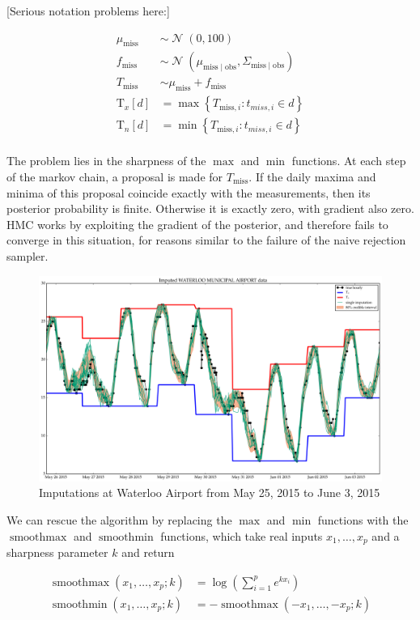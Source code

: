 \documentclass[letter]{article}
\makeatletter
\def\maxwidth{\ifdim\Gin@nat@width>\linewidth\linewidth
\else\Gin@nat@width\fi}
\let\Oldincludegraphics\includegraphics
\renewcommand{\includegraphics}[1]{\Oldincludegraphics[width=.8\maxwidth]{#1}}
\newcommand{\genericdel}[3]{%
      \left#1#3\right#2
    }
\newcommand{\del}[1]{\genericdel(){#1}}
\newcommand{\sbr}[1]{\genericdel[]{#1}}
\newcommand{\cbr}[1]{\genericdel\{\}{#1}}
\DeclareMathOperator{\normal}{\mathcal{N}}
\newcommand{\Tn}{\mathrm{T}_{n}}
\newcommand{\Tx}{\mathrm{T}_{x}}
\newcommand{\miss}{\mathrm{miss}}
\newcommand{\obs}{\mathrm{obs}}
\DeclareMathOperator{\softmax}{smoothmax}
\DeclareMathOperator{\softmin}{smoothmin}
\makeatother
\begin{document}
{[}Serious notation problems here:{]}

\begin{align}
    \mu_\miss &\sim \normal\del{0,100} \\
    f_\miss &\sim \normal\del{\mu_{\miss \mid \obs}, \Sigma_{\miss \mid \obs}} \\
    T_\miss &\sim \mu_\miss + f_\miss \\
    \Tx\sbr{d} &= \max\cbr{ T_{\miss,i}: t_{miss,i} \in d } \\
    \Tn\sbr{d} &= \min\cbr{ T_{\miss,i}: t_{miss,i} \in d } \\
\end{align}

The problem lies in the sharpness of the \(\max\) and \(\min\)
functions. At each step of the markov chain, a proposal is made for
\(T_\miss\). If the daily maxima and minima of this proposal coincide
exactly with the measurements, then its posterior probability is finite.
Otherwise it is exactly zero, with gradient also zero. HMC works by
exploiting the gradient of the posterior, and therefore fails to
converge in this situation, for reasons similar to the failure of the
naive rejection sampler.

\begin{figure}
\centering
\includegraphics{figures/imputations_SEonly.png}
\caption{Imputations at Waterloo Airport from May 25, 2015 to June 3,
2015}
\end{figure}

We can rescue the algorithm by replacing the \(\max\) and \(\min\)
functions with the \(\softmax\) and \(\softmin\) functions, which take
real inputs \(x_1, \ldots, x_p\) and a sharpness parameter \(k\) and
return

\begin{align}
    \softmax\del{x_1, \ldots, x_p ; k} &= \log\del{\sum_{i=1}^p e^{kx_i}} \\
    \softmin\del{x_1, \ldots, x_p ; k} &= -\softmax\del{-x_1, \ldots, -x_p; k}
\end{align}
\end{document}
